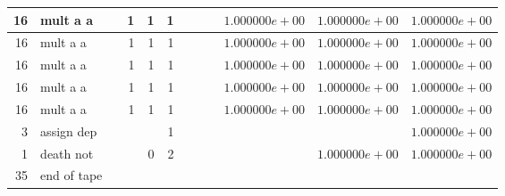 \documentclass{article}
\begin{document}
\begin{tabular}{|r|l|r|r|r|r||r|r||r|r|r|r|}
16 & mult a a & & 1 & 1 & 1 & & & &$ 1.000000e+00 $&$ 1.000000e+00 $&$ 1.000000e+00 $\\ \hline 
16 & mult a a & & 1 & 1 & 1 & & & &$ 1.000000e+00 $&$ 1.000000e+00 $&$ 1.000000e+00 $\\ \hline 
16 & mult a a & & 1 & 1 & 1 & & & &$ 1.000000e+00 $&$ 1.000000e+00 $&$ 1.000000e+00 $\\ \hline 
16 & mult a a & & 1 & 1 & 1 & & & &$ 1.000000e+00 $&$ 1.000000e+00 $&$ 1.000000e+00 $\\ \hline 
16 & mult a a & & 1 & 1 & 1 & & & &$ 1.000000e+00 $&$ 1.000000e+00 $&$ 1.000000e+00 $\\ \hline 
3 & assign dep & & & & 1 & & & & & &$ 1.000000e+00 $\\ \hline 
1 & death not & & & 0 & 2 & & & & &$ 1.000000e+00 $&$ 1.000000e+00 $\\ \hline 
 35 & end of tape & & & & & & & & & &  \\ \hline 
\end{tabular}
\end{document}
